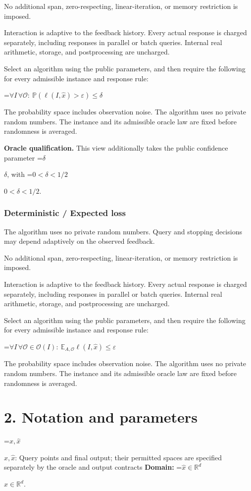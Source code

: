 \documentclass[10pt,a4paper]{article}
\newcommand{\AtlasMath}[1]{\par\begingroup\centering\setbox0=\hbox{$\displaystyle #1$}\ifdim\wd0>1.4\linewidth\typeout{ATLAS WIDE FORMULA: \the\wd0}\fi\ifdim\wd0>\linewidth\resizebox{\linewidth}{!}{\box0}\else\box0\fi\par\endgroup}
\newcommand{\AtlasInlineMath}[1]{\begingroup\setbox0=\hbox{$#1$}\ifdim\wd0>.4\linewidth\endgroup\AtlasMath{#1}\else\endgroup$#1$\fi}
\begin{document}
No additional span, zero-respecting, linear-iteration, or memory restriction is imposed.

Interaction is adaptive to the feedback history. Every actual response is charged separately, including responses in parallel or batch queries. Internal real arithmetic, storage, and postprocessing are uncharged.

Select an algorithm using the public parameters, and then require the following for every admissible instance and response rule:


\AtlasMath{\forall I\,\forall\mathcal{O}:\ \mathbb{P}(\ell(I,\widehat{x})>\varepsilon)\le\delta}


The probability space includes observation noise. The algorithm uses no private random numbers. The instance and its admissible oracle law are fixed before randomness is averaged.

\textbf{Oracle qualification.} This view additionally takes the public confidence parameter \AtlasInlineMath{\delta}, with \AtlasInlineMath{0<\delta<1/2}.

\subsubsection{Deterministic / Expected loss}
The algorithm uses no private random numbers. Query and stopping decisions may depend adaptively on the observed feedback.

No additional span, zero-respecting, linear-iteration, or memory restriction is imposed.

Interaction is adaptive to the feedback history. Every actual response is charged separately, including responses in parallel or batch queries. Internal real arithmetic, storage, and postprocessing are uncharged.

Select an algorithm using the public parameters, and then require the following for every admissible instance and response rule:


\AtlasMath{\forall I\,\forall\mathcal{O}\in\mathcal{O}(I):\ \mathbb{E}_{A,\mathcal{O}}\ell(I,\widehat{x})\le\varepsilon}


The probability space includes observation noise. The algorithm uses no private random numbers. The instance and its admissible oracle law are fixed before randomness is averaged.

\section{2. Notation and parameters}
\AtlasInlineMath{x,\widehat{x}}: Query points and final output; their permitted spaces are specified separately by the oracle and output contracts \textbf{Domain:} \AtlasInlineMath{\widehat{x}\in \mathbb{R}^d}.
\end{document}
